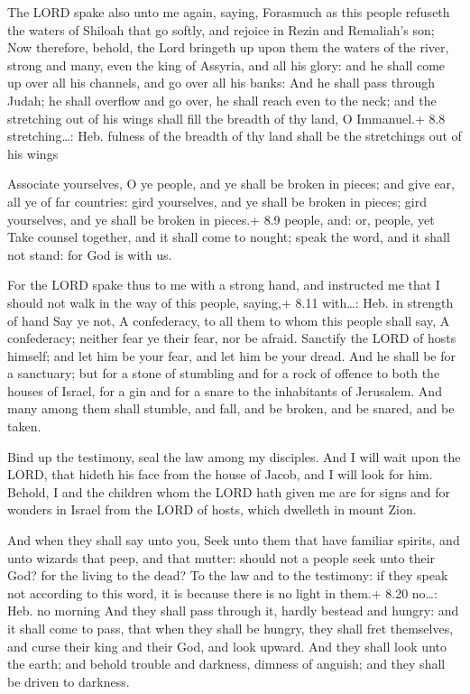  The LORD spake also unto me again, saying, 
Forasmuch as this people refuseth the waters of Shiloah that go softly,
and rejoice in Rezin and Remaliah's son;  Now therefore,
behold, the Lord bringeth up upon them the waters of the river, strong
and many, even the king of Assyria, and all his glory: and he shall come
up over all his channels, and go over all his banks:  And he
shall pass through Judah; he shall overflow and go over, he shall reach
even to the neck; and the stretching out of his wings shall fill the
breadth of thy land, O Immanuel.+ 8.8 stretching\ldots: Heb. fulness of
the breadth of thy land shall be the stretchings out of his wings

 Associate yourselves, O ye people, and ye shall be broken
in pieces; and give ear, all ye of far countries: gird yourselves, and
ye shall be broken in pieces; gird yourselves, and ye shall be broken in
pieces.+ 8.9 people, and: or, people, yet  Take counsel
together, and it shall come to nought; speak the word, and it shall not
stand: for God is with us.

 For the LORD spake thus to me with a strong hand, and
instructed me that I should not walk in the way of this people, saying,+
8.11 with\ldots: Heb. in strength of hand  Say ye not, A
confederacy, to all them to whom this people shall say, A confederacy;
neither fear ye their fear, nor be afraid.  Sanctify the
LORD of hosts himself; and let him be your fear, and let him be your
dread.  And he shall be for a sanctuary; but for a stone of
stumbling and for a rock of offence to both the houses of Israel, for a
gin and for a snare to the inhabitants of Jerusalem.  And
many among them shall stumble, and fall, and be broken, and be snared,
and be taken.

 Bind up the testimony, seal the law among my disciples.
 And I will wait upon the LORD, that hideth his face from
the house of Jacob, and I will look for him.  Behold, I and
the children whom the LORD hath given me are for signs and for wonders
in Israel from the LORD of hosts, which dwelleth in mount Zion.

 And when they shall say unto you, Seek unto them that
have familiar spirits, and unto wizards that peep, and that mutter:
should not a people seek unto their God? for the living to the dead?
 To the law and to the testimony: if they speak not
according to this word, it is because there is no light in them.+ 8.20
no\ldots: Heb. no morning  And they shall pass through it,
hardly bestead and hungry: and it shall come to pass, that when they
shall be hungry, they shall fret themselves, and curse their king and
their God, and look upward.  And they shall look unto the
earth; and behold trouble and darkness, dimness of anguish; and they
shall be driven to darkness.

